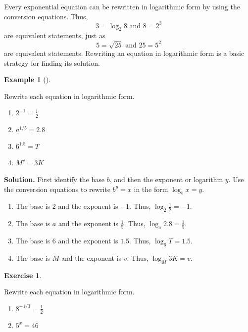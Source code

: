 \documentclass[10pt,]{book}
\theoremstyle{plain}
\theoremstyle{definition}
\theoremstyle{definition}
\theoremstyle{definition}
\newtheorem{example}[theorem]{Example}
\theoremstyle{definition}
\theoremstyle{definition}
\newtheorem{exercise}[theorem]{Exercise}
\numberwithin{equation}{section}
\begin{document}
	Every exponential equation can be rewritten in logarithmic form by using the conversion equations. Thus,
	\begin{equation*}3 = \log_{2}{8} \text{ and } 8 = 2^3\end{equation*}
	are equivalent statements, just as
	\begin{equation*}5 = \sqrt{25} \text{ and } 25 = 5^2\end{equation*}
	are equivalent statements. Rewriting an equation in logarithmic form is a basic  strategy for finding its solution.
%
\begin{example}[]\label{example-exponential-to-log-form}

	Rewrite each equation in logarithmic form.
	\leavevmode%
\begin{enumerate}[label=*\alph**]
\item\hypertarget{li-698}{}\(2^{−1} = \frac{1}{2}\)\item\hypertarget{li-699}{}\(a^{1/5} = 2.8\)\item\hypertarget{li-700}{}\(6^{1.5} = T\)\item\hypertarget{li-701}{}\(M^v = 3K\)\end{enumerate}

%
\par\medskip\noindent%
\textbf{Solution.}\quad 
	First identify the base \(b\), and then the exponent or logarithm \(y\). Use the conversion equations to rewrite \(b^y = x\) in the form \(\log_{b}{x} = y\).
	\leavevmode%
\begin{enumerate}[label=*\alph**]
\item\hypertarget{li-702}{}The base is \(2\) and the exponent is \(−1\). Thus, \(\log_{2}{\frac{1}{2}}= −1\).\item\hypertarget{li-703}{}The base is \(a\) and the exponent is \(\frac{1}{5}\). Thus, \(\log_{a}{2.8} = \frac{1}{5}\).\item\hypertarget{li-704}{}The base is \(6\) and the exponent is \(1.5\). Thus, \(\log_{6}{T} = 1.5\).\item\hypertarget{li-705}{}The base is \(M\) and the exponent is \(v\). Thus, \(\log_{M}{3K} = v\).\end{enumerate}

%
\end{example}
\begin{exercise}\label{exercise-exponential-to-log-form}

	Rewrite each equation in logarithmic form.
	\leavevmode%
\begin{enumerate}[label=*\alph**]
\item\hypertarget{li-706}{}\(8^{−1/3} = \frac{1}{2}\)\item\hypertarget{li-707}{}\(5^x = 46\)\end{enumerate}

%
\end{exercise}
\typeout{************************************************}
\typeout{************************************************}
\end{document}
